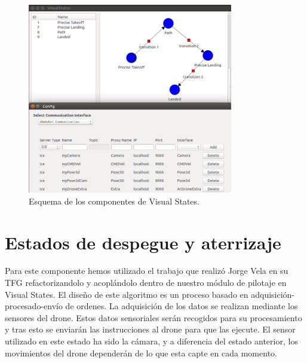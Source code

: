 
\begin{figure}[H]
	\begin{center}
		\includegraphics[width=0.8\textwidth]{imag/IMG32.png}
				\caption{Esquema de los componentes de Visual States.}
		\label{fig:Esquema VisualStates.}	
	\end{center}
\end{figure}

\section{Estados de despegue y aterrizaje}
\hspace{1cm} Para este componente hemos utilizado el trabajo que realizó Jorge Vela en su TFG \cite{JorgeVela} refactorizandolo y acoplándolo dentro de nuestro módulo de pilotaje en Visual States. El diseño de este algoritmo es un proceso basado en adquisición-procesado-envío de ordenes.  La adquisición de los datos se realizan mediante los sensores del drone. Estos datos sensoriales serán recogidos para su procesamiento y tras esto se enviarán las instrucciones al drone para que las ejecute. El sensor  utilizado en este estado ha sido la cámara, y a diferencia del estado anterior, los movimientos del drone dependerán de lo que esta capte en cada momento.

